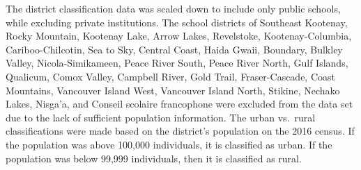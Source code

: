 \documentclass[
  english,
  man]{apa6}
\begin{document}
The district classification data was scaled down to include only public schools, while excluding private institutions. The school districts of Southeast Kootenay, Rocky Mountain, Kootenay Lake, Arrow Lakes, Revelstoke, Kootenay-Columbia, Cariboo-Chilcotin, Sea to Sky, Central Coast, Haida Gwaii, Boundary, Bulkley Valley, Nicola-Simikameen, Peace River South, Peace River North, Gulf Islands, Qualicum, Comox Valley, Campbell River, Gold Trail, Fraser-Cascade, Coast Mountains, Vancouver Island West, Vancouver Island North, Stikine, Nechako Lakes, Nisga'a, and Conseil scolaire francophone were excluded from the data set due to the lack of sufficient population information. The urban vs.~rural classifications were made based on the district's population on the 2016 census. If the population was above 100,000 individuals, it is classified as urban. If the population was below 99,999 individuals, then it is classified as rural.
\end{document}
